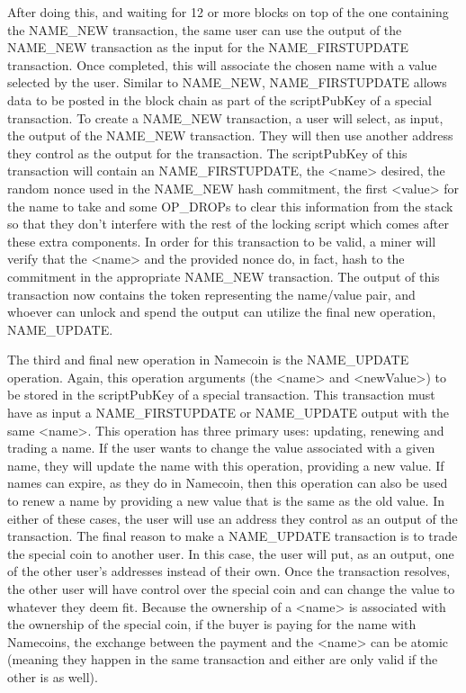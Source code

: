After doing this, and waiting for 12 or more blocks on top of the one containing the NAME\_NEW transaction, the same user can use the output of the NAME\_NEW transaction as the input for the NAME\_FIRSTUPDATE transaction. Once completed, this will associate the chosen name with a value selected by the user. Similar to NAME\_NEW, NAME\_FIRSTUPDATE allows data to be posted in the block chain as part of the scriptPubKey of a special transaction. 
To create a NAME\_NEW transaction, a user will select, as input, the output of the NAME\_NEW transaction. They will then use another address they control as the output for the transaction. The scriptPubKey of this transaction will contain an NAME\_FIRSTUPDATE, the <name> desired, the random nonce used in the NAME\_NEW hash commitment, the first <value> for the name to take and some OP\_DROPs to clear this information from the stack so that they don't interfere with the rest of the locking script which comes after these extra components. In order for this transaction to be valid, a miner will verify that the <name> and the provided nonce do, in fact, hash to the commitment in the appropriate  NAME\_NEW transaction. The output of this transaction now contains the token representing the name/value pair, and whoever can unlock and spend the output can utilize the final new operation, NAME\_UPDATE.

The third and final new operation in Namecoin is the NAME\_UPDATE operation. Again, this operation arguments (the <name> and <newValue>) to be stored in the scriptPubKey of a special transaction. This transaction must have as input a NAME\_FIRSTUPDATE or NAME\_UPDATE output with the same <name>. This operation has three primary uses: updating, renewing and trading a name. If the user wants to change the value associated with a given name, they will update the name with this operation, providing a new value. If names can expire, as they do in Namecoin, then this operation can also be used to renew a name by providing a new value that is the same as the old value. In either of these cases, the user will use an address they control as an output of the transaction. The final reason to make a NAME\_UPDATE transaction is to trade the special coin to another user. In this case, the user will put, as an output, one of the other user's addresses instead of their own. Once the transaction resolves, the other user will have control over the special coin and can change the value to whatever they deem fit. Because the ownership of a <name> is associated with the ownership of the special coin, if the buyer is paying for the name with Namecoins,  the exchange between the payment and the <name> can be atomic (meaning they happen in the same transaction and either are only valid if the other is as well). 

